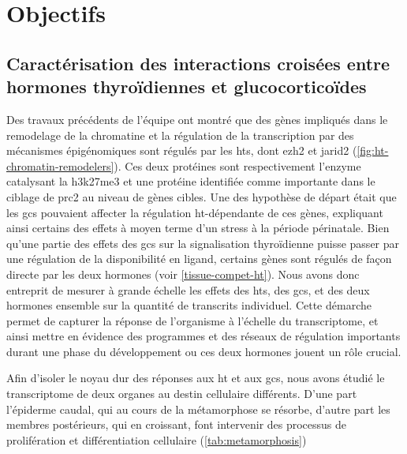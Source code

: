 \section{Objectifs}


\subsection{Caractérisation des interactions croisées entre hormones thyroïdiennes et glucocorticoïdes}
Des travaux précédents de l'équipe ont montré que des gènes impliqués dans le remodelage de la chromatine et la régulation de la transcription par des mécanismes épigénomiques sont régulés par les \glspl{ht}, dont \gls{ezh2} et \gls{jarid2} (\autoref{fig:ht-chromatin-remodelers}).
Ces deux protéines sont respectivement l'enzyme catalysant la \gls{h3k27me3} et une protéine identifiée comme importante dans le ciblage de \gls{prc2} au niveau de gènes cibles.
Une des hypothèse de départ était que les \glspl{gc} pouvaient affecter la régulation \gls{ht}-dépendante de ces gènes, expliquant ainsi certains des effets à moyen terme d'un stress à la période périnatale.
Bien qu'une partie des effets des \glspl{gc} sur la signalisation thyroïdienne puisse passer par une régulation de la disponibilité en ligand, certains gènes sont régulés de façon directe par les deux hormones (voir \autoref{tissue-compet-ht}).
Nous avons donc entreprit de mesurer à grande échelle les effets des \glspl{ht}, des \glspl{gc}, et des deux hormones ensemble sur la quantité de transcrits individuel.
Cette démarche permet de capturer la réponse de l'organisme à l'échelle du transcriptome, et ainsi mettre en évidence des programmes et des réseaux de régulation importants durant une phase du développement ou ces deux hormones jouent un rôle crucial.

Afin d'isoler le noyau dur des réponses aux \gls{ht} et aux \glspl{gc}, nous avons étudié le transcriptome de deux organes au destin cellulaire différents.
D'une part l'épiderme caudal, qui au cours de la métamorphose se résorbe, d'autre part les membres postérieurs, qui en croissant, font intervenir des processus de prolifération et différentiation cellulaire (\autoref{tab:metamorphosis})


